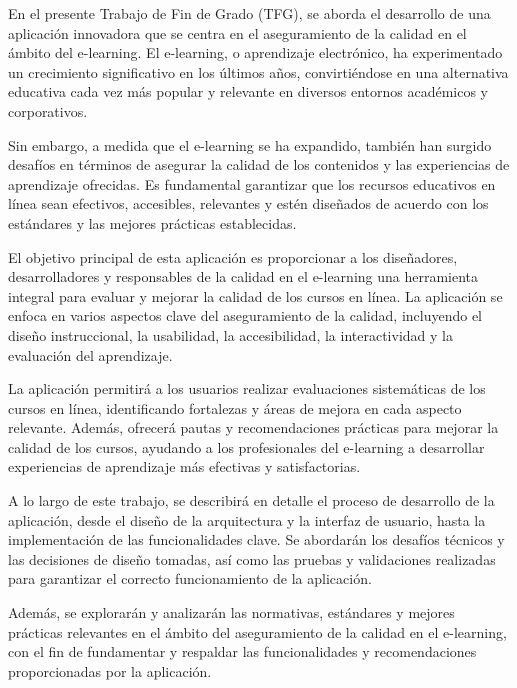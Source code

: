 
En el presente Trabajo de Fin de Grado (TFG), se aborda el desarrollo de una aplicación innovadora que se centra en el aseguramiento de la calidad en el ámbito del e-learning. El e-learning, o aprendizaje electrónico, ha experimentado un crecimiento significativo en los últimos años, convirtiéndose en una alternativa educativa cada vez más popular y relevante en diversos entornos académicos y corporativos.

Sin embargo, a medida que el e-learning se ha expandido, también han surgido desafíos en términos de asegurar la calidad de los contenidos y las experiencias de aprendizaje ofrecidas. Es fundamental garantizar que los recursos educativos en línea sean efectivos, accesibles, relevantes y estén diseñados de acuerdo con los estándares y las mejores prácticas establecidas.

El objetivo principal de esta aplicación es proporcionar a los diseñadores, desarrolladores y responsables de la calidad en el e-learning una herramienta integral para evaluar y mejorar la calidad de los cursos en línea. La aplicación se enfoca en varios aspectos clave del aseguramiento de la calidad, incluyendo el diseño instruccional, la usabilidad, la accesibilidad, la interactividad y la evaluación del aprendizaje. 

La aplicación permitirá a los usuarios realizar evaluaciones sistemáticas de los cursos en línea, identificando fortalezas y áreas de mejora en cada aspecto relevante. Además, ofrecerá pautas y recomendaciones prácticas para mejorar la calidad de los cursos, ayudando a los profesionales del e-learning a desarrollar experiencias de aprendizaje más efectivas y satisfactorias.

A lo largo de este trabajo, se describirá en detalle el proceso de desarrollo de la aplicación, desde el diseño de la arquitectura y la interfaz de usuario, hasta la implementación de las funcionalidades clave. Se abordarán los desafíos técnicos y las decisiones de diseño tomadas, así como las pruebas y validaciones realizadas para garantizar el correcto funcionamiento de la aplicación.

Además, se explorarán y analizarán las normativas, estándares y mejores prácticas relevantes en el ámbito del aseguramiento de la calidad en el e-learning, con el fin de fundamentar y respaldar las funcionalidades y recomendaciones proporcionadas por la aplicación.